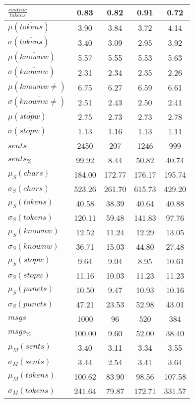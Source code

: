 \begin{table}[h!]
\begin{center}
\begin{tabular}{| l || c | c | c | c |}
$\frac{contrac}{tokens}$ & 0.83  & 0.82  & 0.91  & 0.72 \\\hline\hline
$\mu(\overline{tokens})$ & 3.90  & 3.84  & 3.72  & 4.14 \\
$\sigma(\overline{tokens})$ & 3.40  & 3.09  & 2.95  & 3.92 \\\hline
$\mu(\overline{knownw})$ & 5.57  & 5.55  & 5.53  & 5.63 \\
$\sigma(\overline{knownw})$ & 2.31  & 2.34  & 2.35  & 2.26 \\\hline
$\mu(\overline{knownw \neq})$ & 6.75  & 6.27  & 6.59  & 6.61 \\
$\sigma(\overline{knownw \neq})$ & 2.51  & 2.43  & 2.50  & 2.41 \\\hline
$\mu(\overline{stopw})$ & 2.75  & 2.73  & 2.73  & 2.78 \\
$\sigma(\overline{stopw})$ & 1.13  & 1.16  & 1.13  & 1.11 \\\hline\hline
$sents$ & 2450  & 207  & 1246  & 999 \\
$sents_{\%}$ & 99.92  & 8.44  & 50.82  & 40.74 \\\hline
$\mu_S(chars)$ & 184.00  & 172.77  & 176.17  & 195.74 \\
$\sigma_S(chars)$ & 523.26  & 261.70  & 615.73  & 429.20 \\\hline
$\mu_S(tokens)$ & 40.58  & 38.39  & 40.64  & 40.88 \\
$\sigma_S(tokens)$ & 120.11  & 59.48  & 141.83  & 97.76 \\\hline
$\mu_S(knownw)$ & 12.52  & 11.24  & 12.29  & 13.05 \\
$\sigma_S(knownw)$ & 36.71  & 15.03  & 44.80  & 27.48 \\\hline
$\mu_S(stopw)$ & 9.64  & 9.04  & 8.95  & 10.61 \\
$\sigma_S(stopw)$ & 11.16  & 10.03  & 11.23  & 11.23 \\\hline
$\mu_S(puncts)$ & 10.50  & 9.47  & 10.93  & 10.16 \\
$\sigma_S(puncts)$ & 47.21  & 23.53  & 52.98  & 43.01 \\\hline\hline
$msgs$ & 1000  & 96  & 520  & 384 \\
$msgs_{\%}$ & 100.00  & 9.60  & 52.00  & 38.40 \\\hline
$\mu_M(sents)$ & 3.40  & 3.11  & 3.34  & 3.55 \\
$\sigma_M(sents)$ & 3.44  & 2.54  & 3.41  & 3.64 \\\hline
$\mu_M(tokens)$ & 100.62  & 83.90  & 98.56  & 107.58 \\
$\sigma_M(tokens)$ & 241.64  & 79.87  & 172.71  & 331.57 \\\hline

\end{tabular}
\end{center}
\end{table}
